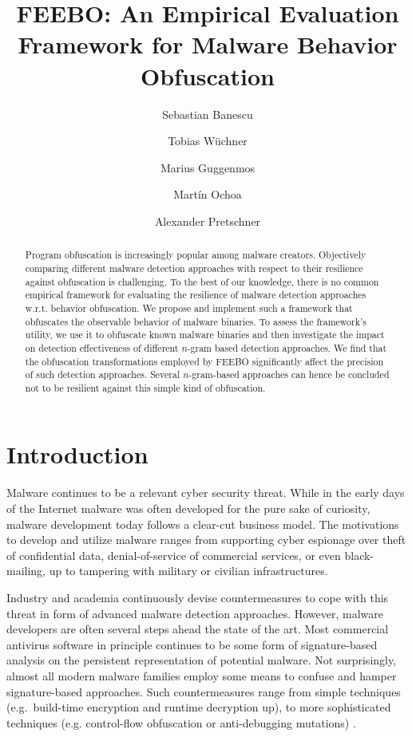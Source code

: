 \documentclass{llncs}
\newcommand{\done}[1]{}
\begin{document}
\title{FEEBO: An Empirical Evaluation Framework for Malware Behavior Obfuscation}


\author{Sebastian Banescu \and Tobias W\"uchner \and Marius Guggenmos \and Mart\'in Ochoa \and Alexander Pretschner}

\maketitle

\begin{abstract}
Program obfuscation is increasingly popular among malware creators. Objectively comparing different malware 
detection approaches with respect to their resilience against obfuscation is
challenging. To the best of our knowledge, there is no common empirical 
framework for evaluating the resilience of malware detection approaches w.r.t. behavior obfuscation.
We propose and implement such a framework that obfuscates the observable behavior of malware binaries. 
To assess the framework's utility, we use it to obfuscate 
known malware binaries and then investigate the impact on detection 
effectiveness of different $n$-gram based detection approaches.
We find that the obfuscation transformations employed by FEEBO significantly affect the precision of such detection approaches.	Several $n$-gram-based approaches can hence be concluded not to be resilient against this simple kind of obfuscation.
\end{abstract}

\section{Introduction}
\done{TW: consolidate terms: event vs. call; profile vs. configuration vs. setting}
Malware continues to be a relevant cyber security threat. While in the early days of the Internet malware was often developed for the pure sake of curiosity, malware development today follows a clear-cut business model. The motivations to develop and utilize malware ranges from supporting cyber espionage over theft of confidential data, denial-of-service of commercial services, or even black-mailing, up to tampering with military or civilian infrastructures.

Industry and academia continuously devise countermeasures to cope with this threat in form of advanced malware detection approaches. However, malware developers are often several steps ahead the state of the art. 
Most commercial antivirus software in principle continues to be some form of signature-based analysis on the persistent representation of potential malware. Not surprisingly, almost all modern malware families employ some means to confuse and hamper signature-based approaches. Such countermeasures range from simple techniques (e.g.~build-time encryption and runtime decryption up), to more sophisticated techniques (e.g. control-flow obfuscation or anti-debugging mutations) \cite{Collberg2009}. 
\end{document}
